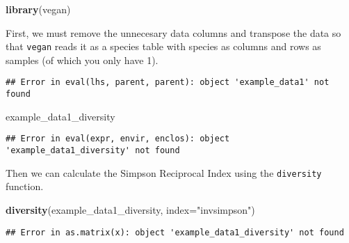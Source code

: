 \documentclass[]{article}
\newenvironment{Shaded}{\begin{snugshade}}{\end{snugshade}}
\newcommand{\KeywordTok}[1]{\textcolor[rgb]{0.13,0.29,0.53}{\textbf{#1}}}
\newcommand{\DataTypeTok}[1]{\textcolor[rgb]{0.13,0.29,0.53}{#1}}
\newcommand{\StringTok}[1]{\textcolor[rgb]{0.31,0.60,0.02}{#1}}
\newcommand{\OperatorTok}[1]{\textcolor[rgb]{0.81,0.36,0.00}{\textbf{#1}}}
\newcommand{\NormalTok}[1]{#1}
\begin{document}
\begin{Shaded}
\begin{Highlighting}[]
\KeywordTok{library}\NormalTok{(vegan)}
\end{Highlighting}
\end{Shaded}

First, we must remove the unnecesary data columns and transpose the data
so that \texttt{vegan} reads it as a species table with species as
columns and rows as samples (of which you only have 1).

\begin{Shaded}
\end{Shaded}

\begin{verbatim}
## Error in eval(lhs, parent, parent): object 'example_data1' not found
\end{verbatim}

\begin{Shaded}
\begin{Highlighting}[]
\NormalTok{example_data1_diversity}
\end{Highlighting}
\end{Shaded}

\begin{verbatim}
## Error in eval(expr, envir, enclos): object 'example_data1_diversity' not found
\end{verbatim}

Then we can calculate the Simpson Reciprocal Index using the
\texttt{diversity} function.

\begin{Shaded}
\begin{Highlighting}[]
\KeywordTok{diversity}\NormalTok{(example_data1_diversity, }\DataTypeTok{index=}\StringTok{"invsimpson"}\NormalTok{)}
\end{Highlighting}
\end{Shaded}

\begin{verbatim}
## Error in as.matrix(x): object 'example_data1_diversity' not found
\end{verbatim}
\end{document}
